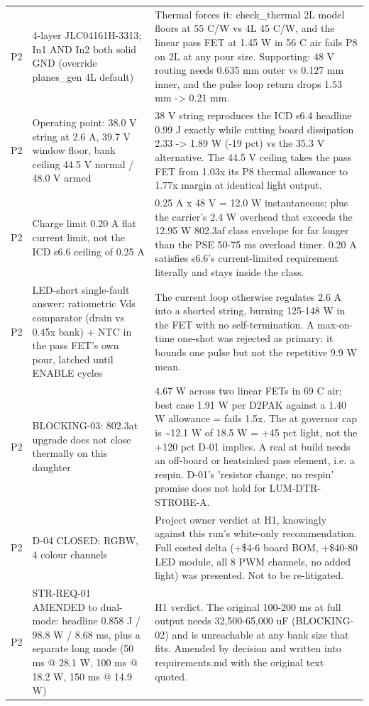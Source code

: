 \documentclass[11pt,a4paper]{article}
\begin{document}
{\begin{longtable}{lp{5.2cm}p{7.2cm}}
P2 & 4-layer JLC04161H-3313; In1 AND In2 both solid GND (override planes\_gen 4L default) & Thermal forces it: check\_thermal 2L model floors at 55 C/W vs 4L 45 C/W, and the linear pass FET at 1.45 W in 56 C air fails P8 on 2L at any pour size. Supporting: 48 V routing needs 0.635 mm outer vs 0.127 mm inner, and the pulse loop return drops 1.53 mm -\textgreater{} 0.21 mm. \\
P2 & Operating point: 38.0 V string at 2.6 A, 39.7 V window floor, bank ceiling 44.5 V normal / 48.0 V armed & 38 V string reproduces the ICD s6.4 headline 0.99 J exactly while cutting board dissipation 2.33 -\textgreater{} 1.89 W (-19 pct) vs the 35.3 V alternative. The 44.5 V ceiling takes the pass FET from 1.03x its P8 thermal allowance to 1.77x margin at identical light output. \\
P2 & Charge limit 0.20 A flat current limit, not the ICD s6.6 ceiling of 0.25 A & 0.25 A x 48 V = 12.0 W instantaneous; plus the carrier's 2.4 W overhead that exceeds the 12.95 W 802.3af class envelope for far longer than the PSE 50-75 ms overload timer. 0.20 A satisfies s6.6's current-limited requirement literally and stays inside the class. \\
P2 & LED-short single-fault answer: ratiometric Vds comparator (drain vs 0.45x bank) + NTC in the pass FET's own pour, latched until ENABLE cycles & The current loop otherwise regulates 2.6 A into a shorted string, burning 125-148 W in the FET with no self-termination. A max-on-time one-shot was rejected as primary: it bounds one pulse but not the repetitive 9.9 W mean. \\
P2 & BLOCKING-03: 802.3at upgrade does not close thermally on this daughter & 4.67 W across two linear FETs in 69 C air; best case 1.91 W per D2PAK against a 1.40 W allowance = fails 1.5x. The at governor cap is \textasciitilde{}12.1 W of 18.5 W = +45 pct light, not the +120 pct D-01 implies. A real at build needs an off-board or heatsinked pass element, i.e. a respin. D-01's 'resistor change, no respin' promise does not hold for LUM-DTR-STROBE-A. \\
P2 & D-04 CLOSED: RGBW, 4 colour channels & Project owner verdict at H1, knowingly against this run's white-only recommendation. Full costed delta (+\$4-6 board BOM, +\$40-80 LED module, all 8 PWM channels, no added light) was presented. Not to be re-litigated. \\
P2 & STR-REQ-01 AMENDED to dual-mode: headline 0.858 J / 98.8 W / 8.68 ms, plus a separate long mode (50 ms @ 28.1 W, 100 ms @ 18.2 W, 150 ms @ 14.9 W) & H1 verdict. The original 100-200 ms at full output needs 32,500-65,000 uF (BLOCKING-02) and is unreachable at any bank size that fits. Amended by decision and written into requirements.md with the original text quoted. \\

\end{longtable}}
\end{document}
